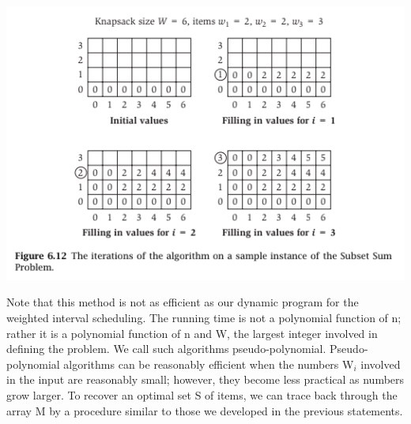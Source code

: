 \documentclass{article}
\begin{document}
\begin{center}
    \includegraphics[]{figures/fig17.png}
\end{center}



Note that this method is not as efficient as our dynamic program for the weighted interval scheduling. The running time is not a polynomial function of n; rather it is a polynomial function of n and W, the largest integer involved in defining the problem. We call such algorithms pseudo-polynomial. Pseudo-polynomial algorithms can be reasonably efficient when the numbers {W$_i$} involved in the input are reasonably small; however, they become less practical as numbers grow larger. To recover an optimal set S of items, we can trace back through the array M by a procedure similar to those we developed in the previous statements.

\end{document}

